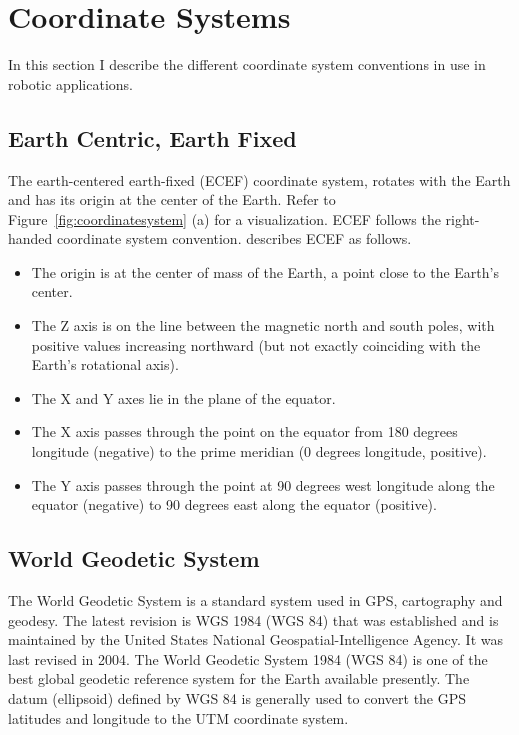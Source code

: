 \section{Coordinate Systems}

In this section I describe the different coordinate system conventions in use in robotic applications. 
	
\subsection{Earth Centric, Earth Fixed}

The earth-centered earth-fixed (ECEF) coordinate system, rotates with the Earth and has its origin at the center of the Earth. Refer to Figure~\ref{fig:coordinatesystem} (a) for a visualization. ECEF follows the right-handed coordinate system convention.  describes ECEF as follows.

\begin{itemize}
	\item The origin is at the center of mass of the Earth, a point close to the Earth's center.
	\item The Z axis is on the line between the magnetic north and south poles, with positive values increasing northward (but not exactly coinciding with the Earth's rotational axis).
	\item The X and Y axes lie in the plane of the equator.
	\item The X axis passes through the point on the equator from 180 degrees longitude (negative) to the prime meridian (0 degrees longitude, positive).
	\item The Y axis passes through the point at 90 degrees west longitude along the equator (negative) to 90 degrees east along the equator (positive).
\end{itemize}

\subsection{World Geodetic System}
The World Geodetic System is a standard system used in GPS, cartography and geodesy. The latest revision is WGS 1984 (WGS 84) that was established and is maintained by the United States National Geospatial-Intelligence Agency. It was last revised in 2004. The World Geodetic System 1984 (WGS 84) is one of the best global geodetic reference system for the Earth available presently. The datum (ellipsoid) defined by WGS 84 is generally used to convert the GPS latitudes and longitude to the UTM coordinate system.

